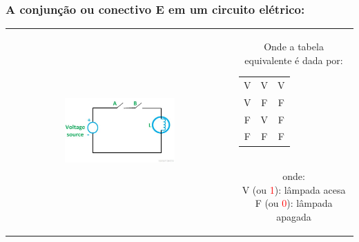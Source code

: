 \documentclass{beamer}
\begin{document}
\begin{frame}
\frametitle{A \textbf{conjunção} ou conectivo \textbf{E}  em um circuito elétrico:}

\begin{tabular}{c||c}  
 
 \includegraphics[height=0.5\textheight,width=0.5\textwidth]{figuras/circuito_AND.jpg} 
 
  &
  \parbox{0.4\linewidth}{\vspace{-4cm} Onde a tabela equivalente é dada por:\\
  	\begin{tabular}{|c|c|c|}
	\hline
	$\mathbf{A}$ & $\mathbf{B}$ & $\mathbf{A \wedge B}$ \\
	\hline
	V & V & V \\
	\hline
	V & F & F \\
	\hline
	F & V & F \\
	\hline
	F & F & F \\
	\hline
	\end{tabular}\\
  onde:\\
	V (ou  \textcolor{red}{1}): lâmpada acesa\\
	F (ou \textcolor{red}{0}): lâmpada apagada\\

  } %

\end{tabular} 	

\end{frame}
\end{document}
